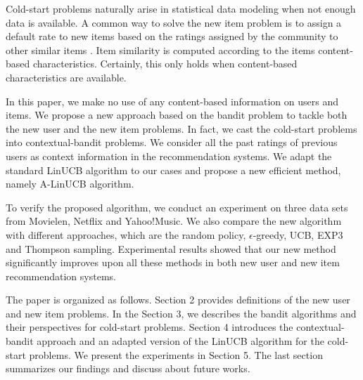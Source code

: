 \documentclass[twoside,leqno,twocolumn]{article}
\newcommand{\pp}[1]{\color{red}(pp) #1\color{black}}
\newcommand{\hai}[1]{\color{blue}(hai) #1\color{black}}
\begin{document}
Cold-start problems naturally arise in statistical data modeling when
not enough data is available. A common way to solve the new item
problem is to assign a default rate to new items based on the
ratings assigned by the community to other similar items \cite{Agarwal:2009:SME:1526709.1526713}. Item
similarity is computed according to the items content-based
characteristics. Certainly, this only holds when content-based
characteristics are available.




In this paper, we make no use of any content-based information on users and items. We propose a new approach based on the bandit problem to tackle both the new user and the new item problems. In fact, we cast the cold-start problems into contextual-bandit problems. We consider all the past ratings of previous users as context information in the recommendation systems. We adapt the standard LinUCB algorithm to our cases and propose a new efficient method, namely A-LinUCB algorithm.

To verify the proposed algorithm, we conduct an experiment on three data sets from Movielen, Netflix and Yahoo!Music. We also compare the new algorithm with different approaches, which are the random policy, $\epsilon$-greedy, UCB, EXP3 and Thompson sampling. Experimental results showed that our new method significantly improves upon all these methods in both new user and new item recommendation systems.

The paper is organized as follows. Section 2 provides definitions of the new user and new item problems. In the Section 3, we describes the bandit algorithms and their perspectives for cold-start problems. Section 4 introduces the contextual-bandit approach and an adapted version of the LinUCB algorithm for the cold-start problems. We present the experiments in Section 5. The last section summarizes our findings and discuss about future works. 
\end{document}
